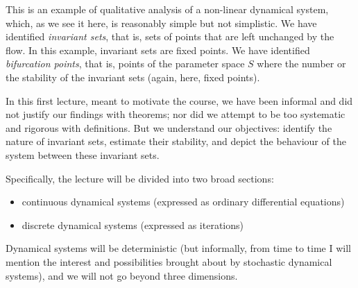This is an example of qualitative analysis of a non-linear dynamical
system, which, as we see it here, is reasonably simple but not
simplistic. We have identified \emph{invariant sets}, that is, sets of
points that are left unchanged by the flow. In this example, invariant
sets are fixed points. We have identified \emph{bifurcation points},
that is, points of the parameter space \(S\) where the number or the
stability of the invariant sets (again, here, fixed points).

In this first lecture, meant to motivate the course, we have been
informal and did not justify our findings with theorems; nor did we
attempt to be too systematic and rigorous with definitions. But we
understand our objectives: identify the nature of invariant sets,
estimate their stability, and depict the behaviour of the system between
these invariant sets.

Specifically, the lecture will be divided into two broad sections:

\begin{itemize}
\tightlist
\item
  continuous dynamical systems (expressed as ordinary differential
  equations)
\item
  discrete dynamical systems (expressed as iterations)
\end{itemize}

Dynamical systems will be deterministic (but informally, from time to
time I will mention the interest and possibilities brought about by
stochastic dynamical systems), and we will not go beyond three
dimensions.
